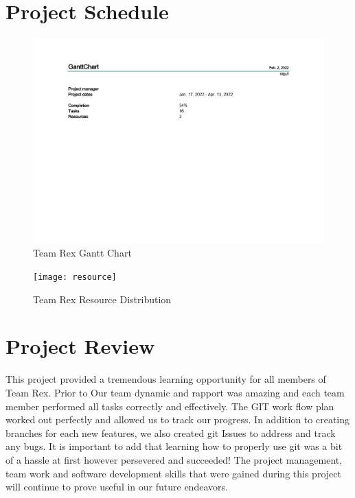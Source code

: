 \documentclass{article}
\begin{document}
	\section{Project Schedule}


		\begin{figure}[h]
			\centering
			\includegraphics[scale=0.9,angle=90]{ganttChart}
			\caption{Team Rex Gantt Chart}
		\end{figure}		
	
		\begin{figure}[h]
			\centering
			\texttt{[image: resource]}
			\caption{Team Rex Resource Distribution}
		\end{figure}		
	
	
	\section{Project Review}
	\color{blue}
	This project provided a tremendous learning opportunity for all members of Team Rex. Prior to
	Our team dynamic and rapport was amazing and each team member performed all tasks correctly and effectively.
	The GIT work flow plan worked out perfectly and allowed us to track our progress. In addition to creating branches for each new features, we also created git Issues to address and track any bugs. It is important to add that learning how to properly use git was a bit of a hassle at first however persevered and succeeded!
	The project management, team work and software development skills that were gained during this project will continue to prove useful in our future endeavors.
	
\end{document}
